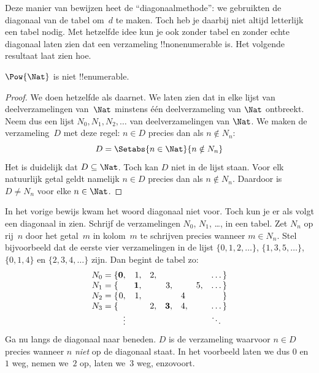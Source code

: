 \documentclass[openany]{memoir}
\begin{document}
\begin{explain}
Deze manier van bewijzen heet de ``diagonaalmethode'': we gebruikten de
diagonaal van de tabel om~$d$ te maken. Toch heb je daarbij niet altijd
letterlijk een tabel nodig. Met hetzelfde idee kun je ook zonder tabel
en zonder echte diagonaal laten zien dat een
verzameling !!{nonenumerable} is. Het volgende resultaat laat zien hoe.
\end{explain}

\begin{thm}
$\Pow{\Nat}$ is niet !!{enumerable}.
\end{thm}

\begin{proof}
We doen hetzelfde als daarnet. We laten zien dat in elke lijst van
deelverzamelingen van~$\Nat$ minstens één deelverzameling van $\Nat$
ontbreekt. Neem dus een lijst $N_0, N_1, N_2, \ldots$ van
deelverzamelingen van $\Nat$. We maken de verzameling~$D$ met deze
regel: $n \in D$ precies dan als $n \notin N_{n}$:
\[
D = \Setabs{n \in \Nat}{n \notin N_n}
\]
Het is duidelijk dat $D\subseteq \Nat$. Toch kan $D$ niet in de lijst
staan. Voor elk natuurlijk getal geldt namelijk $n \in D$ precies dan als
$n\notin N_n$. Daardoor is $D \neq N_n$ voor elke $n \in \Nat$.
\end{proof}

\begin{explain}
In het vorige bewijs kwam het woord diagonaal niet voor. Toch kun je
er als volgt een diagonaal in zien. Schrijf de verzamelingen $N_0$,
$N_1$, \dots, in een tabel. Zet $N_n$ op rij~$n$ door het getal~$m$ in
kolom~$m$ te schrijven precies wanneer $m \in N_n$. Stel bijvoorbeeld dat de eerste
vier verzamelingen in de lijst $\{0,1,2,\dots\}$,
$\{1, 3, 5, \dots\}$, $\{0,1,4\}$ en $\{2,3,4,\dots\}$ zijn. Dan begint
de tabel zo:
\[
\begin{array}{r@{}rrrrrrr}
  N_0 = \{ & \mathbf{0}, & 1, & 2, & & & & \dots\}\\
  N_1 = \{ &  & \mathbf{1}, &  & 3, &  & 5, & \dots\}\\
  N_2 = \{ & 0, & 1, &  &  & 4\phantom{,} &  & \}\\
  N_3 = \{ &  &  & 2, & \mathbf{3}, & 4, & & \dots\}\\
  &\vdots & & & & & & \ddots\phantom{\}}
  \end{array}
\]
Ga nu langs de diagonaal naar beneden. $D$ is de verzameling waarvoor
$n \in D$ precies wanneer $n$ \emph{niet} op de diagonaal staat. In het voorbeeld laten
we dus $0$ en $1$ weg, nemen we~$2$ op, laten we~$3$ weg, enzovoort.
\end{explain}
\end{document}
